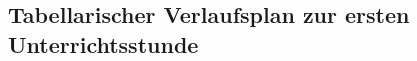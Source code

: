 \documentclass[12pt]{article}
\begin{document}
\newpage
\printbibliography[heading=bibintoc]
\pagestyle{empty}

\newpage
\begin{appendices}

    \section{Tabellarischer Verlaufsplan zur ersten Unterrichtsstunde}
    \begin{center}
    \end{center}
    
\end{appendices}
\end{document}
